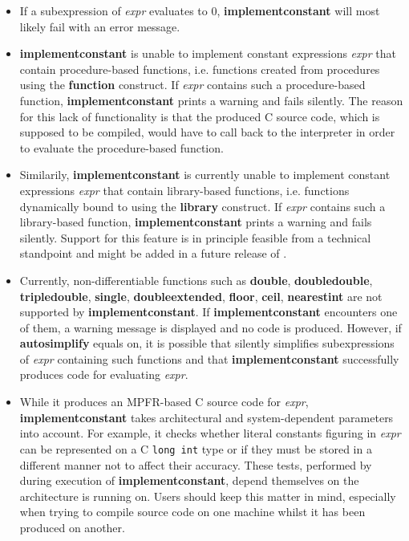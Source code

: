 \begin{itemize}
\item If a subexpression of \emph{expr} evaluates to $0$, \textbf{implementconstant} will most
   likely fail with an error message.

\item \textbf{implementconstant} is unable to implement constant expressions \emph{expr} that
   contain procedure-based functions, i.e. functions created from \sollya
   procedures using the \textbf{function} construct. If \emph{expr} contains such a
   procedure-based function, \textbf{implementconstant} prints a warning and fails
   silently. The reason for this lack of functionality is that the
   produced C source code, which is supposed to be compiled, would have
   to call back to the \sollya interpreter in order to evaluate the
   procedure-based function.

\item Similarily, \textbf{implementconstant} is currently unable to implement constant
   expressions \emph{expr} that contain library-based functions, i.e.
   functions dynamically bound to \sollya using the \textbf{library} construct.
   If \emph{expr} contains such a library-based function, \textbf{implementconstant} prints
   a warning and fails silently. Support for this feature is in principle
   feasible from a technical standpoint and might be added in a future
   release of \sollya.

\item Currently, non-differentiable functions such as \textbf{double}, \textbf{doubledouble},
   \textbf{tripledouble}, \textbf{single}, \textbf{doubleextended}, \textbf{floor}, \textbf{ceil}, \textbf{nearestint} are not
   supported by \textbf{implementconstant}. If \textbf{implementconstant} encounters one of them,
   a warning message is displayed and no code is produced.
   However, if \textbf{autosimplify} equals on, it is possible that \sollya silently
   simplifies subexpressions of \emph{expr} containing such functions and that
   \textbf{implementconstant} successfully produces code for evaluating \emph{expr}.

\item While it produces an MPFR-based C source code for \emph{expr}, \textbf{implementconstant}
   takes architectural and system-dependent parameters into account.  For
   example, it checks whether literal constants figuring in \emph{expr} can be
   represented on a C \texttt{long int} type or if they must
   be stored in a different manner not to affect their accuracy. These
   tests, performed by \sollya during execution of \textbf{implementconstant}, depend
   themselves on the architecture \sollya is running on. Users should
   keep this matter in mind, especially when trying to compile source
   code on one machine whilst it has been produced on another.
\end{itemize}
